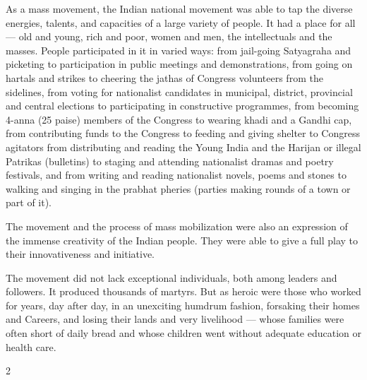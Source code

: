 \begin{multicols}{2}
As a mass movement, the Indian national movement was able to tap the diverse energies, talents, and capacities of a large variety of people. It had a place for all --- old and young, rich and poor, women and men, the intellectuals and the masses. People participated in it in varied ways: from jail-going Satyagraha and picketing to participation in public meetings and demonstrations, from going on hartals and strikes to cheering the jathas of Congress volunteers from the sidelines, from voting for nationalist candidates in municipal, district, provincial and central elections to participating in constructive programmes, from becoming 4-anna (25 paise) members of the Congress to wearing khadi and a Gandhi cap, from contributing funds to the Congress to feeding and giving shelter to Congress agitators from distributing and reading the Young India and the Harijan or illegal Patrikas (bulletins) to staging and attending nationalist dramas and poetry festivals, and from writing and reading nationalist novels, poems and stones to walking and singing in the prabhat pheries (parties making rounds of a town or part of it).

The movement and the process of mass mobilization were also an expression of the immense creativity of the Indian people. They were able to give a full play to their innovativeness and initiative.

The movement did not lack exceptional individuals, both among leaders and followers. It produced thousands of martyrs. But as heroic were those who worked for years, day after day, in an unexciting humdrum fashion, forsaking their homes and Careers, and losing their lands and very livelihood --- whose families were often short of daily bread and whose children went without adequate education or health care.
\end{multicols}{2}
